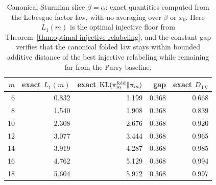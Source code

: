 \begin{table}[H]
\centering
\small
\begin{tabular}{rrrrr}
\toprule
\(m\) & exact \(L_1(m)\) & exact \(\operatorname{KL}(\pi_m^{\mathrm{fold}}\|\pi_m)\) & gap & exact \(D_{\mathrm{TV}}\) \\
\midrule
6  & 0.832 & 1.199 & 0.368 & 0.668 \\
8  & 1.540 & 1.908 & 0.368 & 0.839 \\
10 & 2.308 & 2.676 & 0.368 & 0.920 \\
12 & 3.077 & 3.444 & 0.368 & 0.965 \\
14 & 3.919 & 4.287 & 0.368 & 0.985 \\
16 & 4.762 & 5.129 & 0.368 & 0.994 \\
18 & 5.604 & 5.972 & 0.368 & 0.997 \\
\bottomrule
\end{tabular}
\caption{Canonical Sturmian slice \(\beta=\alpha\): exact quantities computed
from the Lebesgue factor law, with no averaging over \(\beta\) or \(x_0\).
Here \(L_1(m)\) is the optimal injective floor from
Theorem~\ref{thm:optimal-injective-relabeling}, and the constant gap verifies
that the canonical folded law stays within bounded additive distance of the
best injective relabeling while remaining far from the Parry baseline.}
\label{tab:canonical-injective-floor-exact}
\end{table}
